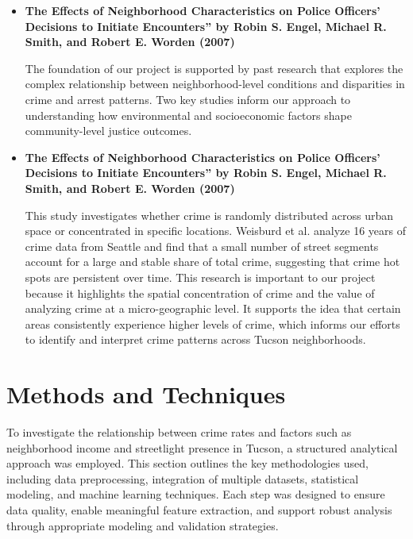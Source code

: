 \documentclass{report}
\begin{document}
\begin{itemize}
\item \textbf{The Effects of Neighborhood Characteristics on Police Officers’ Decisions to Initiate Encounters” by Robin S. Engel, Michael R. Smith, and Robert E. Worden (2007)} \cite{welsh08}
  \par The foundation of our project is supported by past research that explores the complex relationship between neighborhood-level conditions and disparities in crime and arrest patterns. Two key studies inform our approach to understanding how environmental and socioeconomic factors shape community-level justice outcomes.
  
\item \textbf{The Effects of Neighborhood Characteristics on Police Officers’ Decisions to Initiate Encounters” by Robin S. Engel, Michael R. Smith, and Robert E. Worden (2007)} \cite{jr07}
  \par This study investigates whether crime is randomly distributed across urban space or concentrated in specific locations. Weisburd et al. analyze 16 years of crime data from Seattle and find that a small number of street segments account for a large and stable share of total crime, suggesting that crime hot spots are persistent over time. This research is important to our project because it highlights the spatial concentration of crime and the value of analyzing crime at a micro-geographic level. It supports the idea that certain areas consistently experience higher levels of crime, which informs our efforts to identify and interpret crime patterns across Tucson neighborhoods.
  \par 
\end{itemize}


\newpage
\section{Methods and Techniques}

\par To investigate the relationship between crime rates and factors such as neighborhood income and streetlight presence in Tucson, a structured analytical approach was employed. This section outlines the key methodologies used, including data preprocessing, integration of multiple datasets, statistical modeling, and machine learning techniques. Each step was designed to ensure data quality, enable meaningful feature extraction, and support robust analysis through appropriate modeling and validation strategies.
\end{document}

